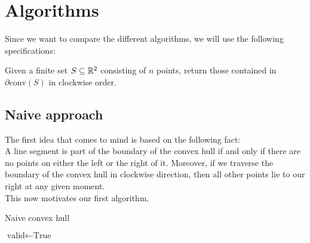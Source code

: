 \section{Algorithms}
    Since we want to compare the different algorithms, we will use the following specifications:
    \begin{mdframed}
        Given a finite set $S \subseteq \mathbb{R}^2$ consisting of $n$ points, return those contained in $\partial \mathrm{conv}(S)$ in clockwise order. 
    \end{mdframed}

    \subsection{Naive approach}
        The first idea that comes to mind is based on the following fact: \\ 
        A line segment is part of the boundary of the convex hull if and only if there are no points on either the left or the right of it. Moreover, if we traverse the boundary of the convex hull in clockwise direction, then all other points lie to our right at any given moment. \\
        This now motivates our first algorithm.

        \begin{breakablealgorithm}
            \caption{Naive convex hull}
            \label{alg:convex_hull_naive}
            \begin{algorithmic}[1]
                     
                         
                            \State $\text{valid} \gets \text{True}$
                             
                            \EndFor
                            \EndIf
                    \EndFor\EndFor
                    \State{} 
                \EndProcedure
            \end{algorithmic}
        \end{breakablealgorithm} 

